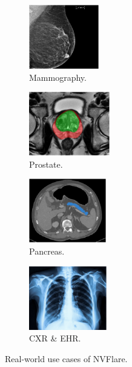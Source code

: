 \documentclass[11pt]{article}
\begin{document}
\begin{figure}[htbp]
\centering
\begin{subfigure}[t]{0.2\textwidth}
    \includegraphics[clip, trim={0.5em 0 0.5em 0}, height=7.5em]{fig/breast.png}
    \caption{\footnotesize Mammography. \label{fig:breast}}
\end{subfigure}\hfill
\begin{subfigure}[t]{0.2\textwidth}
    \includegraphics[clip, trim={1em 0 1em 0}, height=7.5em]{fig/prostate.png}
    \caption{\footnotesize Prostate. \label{fig:prostate}}
\end{subfigure}\hfill
\begin{subfigure}[t]{0.2\textwidth}
    \includegraphics[clip, trim={1em 0 1em 0}, height=7.5em]{fig/pancreas.png}
    \caption{\footnotesize Pancreas. \label{fig:pancreas}}
\end{subfigure}\hfill
\begin{subfigure}[t]{0.2\textwidth}
    \includegraphics[clip, trim={0.5em 0 0.5em 0}, height=7.5em]{fig/cxr.png}
    \caption{\footnotesize CXR \& EHR. \label{fig:cxr}}
\end{subfigure}
\caption{Real-world use cases of NVFlare. \label{fig:use_cases}}
\end{figure}
\end{document}

